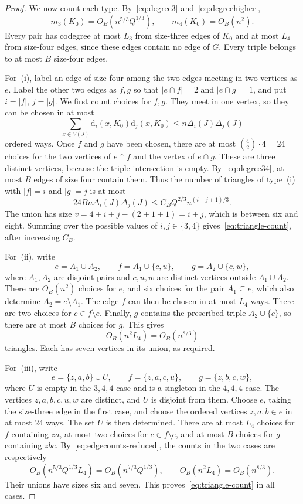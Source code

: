 \documentclass[11pt]{article}
\numberwithin{equation}{section}
\theoremstyle{remark}
\newcommand{\dd}{\mathrm d}
\begin{document}
\begin{proof}
We now count each type. By~\eqref{eq:degree3} and~\eqref{eq:degreehigher},
\begin{equation}\label{eq:edgecounts-reduced}
 m_3(K_0)=O_B(n^{5/3}Q^{1/3}),
 \qquad m_4(K_0)=O_B(n^2).
\end{equation}
Every pair has codegree at most $L_3$ from size-three edges of $K_0$ and at most $L_4$ from size-four edges, since these edges contain no edge of $G$. Every triple belongs to at most $B$ size-four edges.

For~\textup{(i)}, label an edge of size four among the two edges meeting in two vertices as $e$. Label the other two edges as $f,g$ so that $|e\cap f|=2$ and $|e\cap g|=1$, and put $i=|f|$, $j=|g|$. We first count choices for $f,g$. They meet in one vertex, so they can be chosen in at most
\[
 \sum_{x\in V(J)}\dd_i(x,K_0)\dd_j(x,K_0)
 \le n\Delta_i(J)\Delta_j(J)
\]
ordered ways. Once $f$ and $g$ have been chosen, there are at most $\binom42\cdot4=24$ choices for the two vertices of $e\cap f$ and the vertex of $e\cap g$. These are three distinct vertices, because the triple intersection is empty. By~\eqref{eq:degree34}, at most $B$ edges of size four contain them. Thus the number of triangles of type~\textup{(i)} with $|f|=i$ and $|g|=j$ is at most
\[
 24B n\Delta_i(J)\Delta_j(J)
 \le C_B Q^{2/3}n^{(i+j+1)/3}.
\]
The union has size $v=4+i+j-(2+1+1)=i+j$, which is between six and eight. Summing over the possible values of $i,j\in\{3,4\}$ gives~\eqref{eq:triangle-count}, after increasing $C_B$.

For~\textup{(ii)}, write
\[
 e=A_1\cup A_2,\qquad
 f=A_1\cup\{c,u\},\qquad
 g=A_2\cup\{c,w\},
\]
where $A_1,A_2$ are disjoint pairs and $c,u,w$ are distinct vertices outside $A_1\cup A_2$. There are $O_B(n^2)$ choices for $e$, and six choices for the pair $A_1\subseteq e$, which also determine $A_2=e\setminus A_1$. The edge $f$ can then be chosen in at most $L_4$ ways. There are two choices for $c\in f\setminus e$. Finally, $g$ contains the prescribed triple $A_2\cup\{c\}$, so there are at most $B$ choices for $g$. This gives
\[
 O_B(n^2L_4)=O_B(n^{8/3})
\]
triangles. Each has seven vertices in its union, as required.

For~\textup{(iii)}, write
\[
 e=\{z,a,b\}\cup U,\qquad
 f=\{z,a,c,u\},\qquad
 g=\{z,b,c,w\},
\]
where $U$ is empty in the $3,4,4$ case and is a singleton in the $4,4,4$ case. The vertices $z,a,b,c,u,w$ are distinct, and $U$ is disjoint from them. Choose $e$, taking the size-three edge in the first case, and choose the ordered vertices $z,a,b\in e$ in at most $24$ ways. The set $U$ is then determined. There are at most $L_4$ choices for $f$ containing $za$, at most two choices for $c\in f\setminus e$, and at most $B$ choices for $g$ containing $zbc$. By~\eqref{eq:edgecounts-reduced}, the counts in the two cases are respectively
\[
 O_B(n^{5/3}Q^{1/3}L_4)=O_B(n^{7/3}Q^{1/3}),
 \qquad O_B(n^2L_4)=O_B(n^{8/3}).
\]
Their unions have sizes six and seven. This proves~\eqref{eq:triangle-count} in all cases.
\end{proof}
\end{document}

